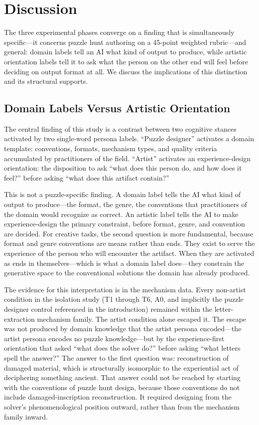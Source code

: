 \section{Discussion}
\label{sec:discussion}

The three experimental phases converge on a finding that is simultaneously specific---it concerns puzzle hunt authoring on a 45-point weighted rubric---and general: domain labels tell an AI what kind of output to produce, while artistic orientation labels tell it to ask what the person on the other end will feel before deciding on output format at all. We discuss the implications of this distinction and its structural supports.

\subsection{Domain Labels Versus Artistic Orientation}

The central finding of this study is a contrast between two cognitive stances activated by two single-word persona labels. ``Puzzle designer'' activates a domain template: conventions, formats, mechanism types, and quality criteria accumulated by practitioners of the field. ``Artist'' activates an experience-design orientation: the disposition to ask ``what does this person do, and how does it feel?'' before asking ``what does this artifact contain?''

This is not a puzzle-specific finding. A domain label tells the AI what kind of output to produce---the format, the genre, the conventions that practitioners of the domain would recognize as correct. An artistic label tells the AI to make experience-design the primary constraint, before format, genre, and convention are decided. For creative tasks, the second question is more fundamental, because format and genre conventions are means rather than ends. They exist to serve the experience of the person who will encounter the artifact. When they are activated as ends in themselves---which is what a domain label does---they constrain the generative space to the conventional solutions the domain has already produced.

The evidence for this interpretation is in the mechanism data. Every non-artist condition in the isolation study (T1 through T6, A0, and implicitly the puzzle designer control referenced in the introduction) remained within the letter-extraction mechanism family. The artist condition alone escaped it. The escape was not produced by domain knowledge that the artist persona encoded---the artist persona encodes no puzzle knowledge---but by the experience-first orientation that asked ``what does the solver do?'' before asking ``what letters spell the answer?'' The answer to the first question was: reconstruction of damaged material, which is structurally isomorphic to the experiential act of deciphering something ancient. That answer could not be reached by starting with the conventions of puzzle hunt design, because those conventions do not include damaged-inscription reconstruction. It required designing from the solver's phenomenological position outward, rather than from the mechanism family inward.

